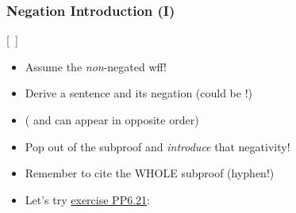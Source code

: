\begin{frame}
  \frametitle{Negation Introduction (\enot I)}
  
\begin{multicols}{2}

\begin{center}
    \begin{fitchproof}
    \open
	\metaA{} 
	 \ellipsesline
	\metaB{}
	 \ellipsesline
\close
{}[\ ]{\enot\metaA{}}
    \end{fitchproof}
    \end{center}
   
   \columnbreak
    
\begin{center}

 \begin{itemize}[<+->]

\item Assume the \emph{non}-negated wff!

\item Derive a sentence and its negation (could be \metaA{}!)

\item (\metaB{} and \enot\metaB{} can appear in opposite order)

\item Pop out of the subproof and \emph{introduce} that negativity! 

\item Remember to cite the WHOLE subproof (hyphen!)

\item Let's try \href{https://tinyurl.com/2p82rpv5}{exercise PP6.21}:

\end{itemize}


  \end{center}
\end{multicols}

\end{frame}

